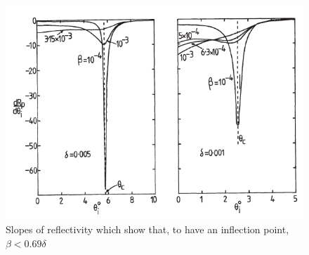 \begin{figure}[]
%
\centering
%
\includegraphics[width=.7\textwidth]{Immagini/Chapter1/InflectionPoint}
%
\caption{Slopes of reflectivity which show that, to have an inflection point, $\beta < 0.69 \delta$}
%
\label{fig: InflectionPoint}
%
\end{figure}